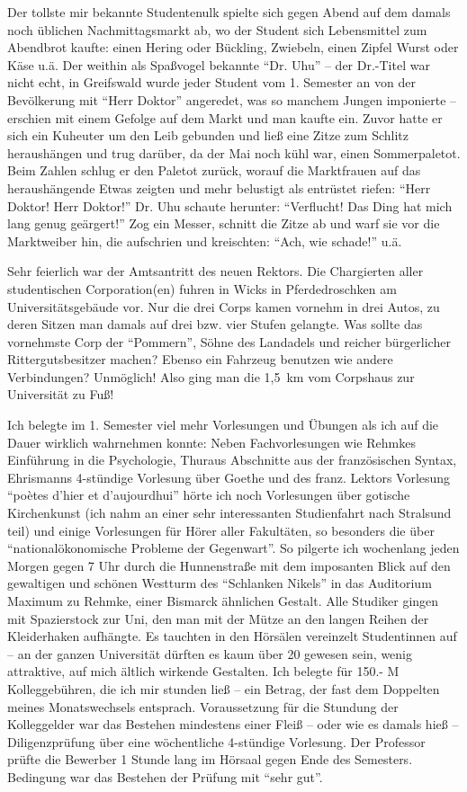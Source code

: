 \documentclass[a5paper,pagesize,10pt,twoside=true]{scrbook}
\renewcommand{\marginpar}[2][]{}
\begin{document}
Der tollste mir bekannte Studentenulk spielte sich gegen Abend auf dem damals noch üblichen Nachmittagsmarkt ab, wo der Student sich Lebensmittel zum Abendbrot kaufte: einen Hering oder Bückling, Zwiebeln, einen Zipfel Wurst oder Käse u.ä. Der weithin als Spaßvogel bekannte \enquote{Dr. Uhu} -- der Dr.-Titel war nicht echt, in Greifswald wurde jeder Student vom 1. Semester an von der Bevölkerung mit \enquote{Herr Doktor} angeredet, was so manchem Jungen imponierte -- erschien mit einem Gefolge auf dem Markt und man kaufte ein. Zuvor hatte er sich ein Kuheuter um den Leib gebunden und ließ eine Zitze zum Schlitz heraushängen und trug darüber, da der Mai noch kühl war, einen Sommerpaletot. \marginpar{89} Beim Zahlen schlug er den Paletot zurück, worauf die Marktfrauen auf das heraushängende Etwas zeigten und mehr belustigt als entrüstet riefen: \enquote{Herr Doktor! Herr Doktor!} Dr. Uhu schaute herunter: \enquote{Verflucht! Das Ding hat mich lang genug geärgert!} Zog ein Messer, schnitt die Zitze ab und warf sie vor die Marktweiber hin, die aufschrien und kreischten: \enquote{Ach, wie schade!} u.ä.

Sehr feierlich war der Amtsantritt des neuen Rektors. Die Chargierten aller studentischen Corporation(en) fuhren in Wicks in Pferdedroschken am Universitätsgebäude vor. Nur die drei Corps kamen vornehm in drei Autos, zu deren Sitzen man damals auf drei bzw. vier Stufen gelangte. Was sollte das vornehmste Corp der \enquote{Pommern}, Söhne des Landadels und reicher bürgerlicher Rittergutsbesitzer machen? Ebenso ein Fahrzeug benutzen wie andere Verbindungen? Unmöglich! Also ging man die 1,5~km vom Corpshaus zur Universität zu Fuß!

Ich belegte im 1. Semester viel mehr Vorlesungen und Übungen als ich auf die Dauer wirklich wahrnehmen konnte: Neben Fachvorlesungen wie Rehmkes Einführung in die Psychologie, Thuraus Abschnitte aus der französischen Syntax, Ehrismanns 4-stündige Vorlesung über Goethe und des franz. Lektors Vorlesung \enquote{poètes d'hier et d'aujourdhui} hörte ich noch Vorlesungen über gotische Kirchenkunst (ich nahm an einer sehr interessanten Studienfahrt nach Stralsund teil) und einige Vorlesungen für Hörer aller Fakultäten, so besonders die über \enquote{nationalökonomische Probleme der Gegenwart}. So pilgerte ich wochenlang jeden Morgen gegen 7 Uhr durch die Hunnenstraße mit dem imposanten Blick auf den gewaltigen und schönen Westturm des \enquote{Schlanken Nikels} in das Auditorium Maximum zu Rehmke, einer Bismarck ähnlichen Gestalt. Alle Studiker gingen mit Spazierstock zur Uni, den man mit der Mütze an den langen Reihen der Kleiderhaken aufhängte. Es tauchten in den Hörsälen vereinzelt Studentinnen auf -- an der ganzen Universität dürften es kaum über 20 gewesen sein, wenig attraktive, auf mich ältlich wirkende Gestalten. Ich belegte für 150.- M Kolleggebühren, die ich mir stunden ließ -- ein Betrag, der fast dem Doppelten meines Monatswechsels entsprach. Voraussetzung für die Stundung der Kolleggelder war das Bestehen mindestens einer Fleiß -- oder wie es damals hieß -- Diligenzprüfung über eine wöchentliche 4-stündige Vorlesung. Der Professor prüfte die Bewerber 1 Stunde lang im Hörsaal gegen Ende des Semesters. Bedingung war das Bestehen der Prüfung mit \enquote{sehr gut}.
\end{document}
